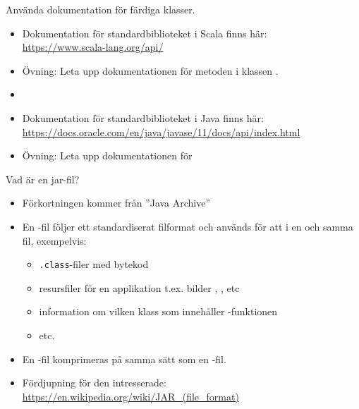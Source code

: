 \begin{Slide}{Använda dokumentation för färdiga klasser.}
\begin{itemize}
  \item Dokumentation för standardbiblioteket i Scala finns här:  \\ \url{https://www.scala-lang.org/api/}
  \item Övning: Leta upp dokumentationen för metoden  i klassen .
  \item[]
  \item Dokumentation för standardbiblioteket i Java finns här:  \\ 
  \url{https://docs.oracle.com/en/java/javase/11/docs/api/index.html}
  \item Övning: Leta upp dokumentationen för 

\end{itemize}
\end{Slide}


\begin{Slide}{Vad är en jar-fil?}
\begin{itemize}
  \item Förkortningen  kommer från ''Java Archive''
  \item En -fil följer ett standardiserat filformat och används för att  i en och samma fil, exempelvis:
  \begin{itemize}
    \item \texttt{.class}-filer med bytekod
    \item resursfiler för en applikation t.ex. bilder , , etc
    \item information om vilken klass som innehåller -funktionen
    \item etc.
  \end{itemize}
  \item En -fil komprimeras på samma sätt som en -fil.
  \item Fördjupning för den intresserade:\\
  {\SlideFontTiny\url{https://en.wikipedia.org/wiki/JAR_(file_format)}}
\end{itemize}
\end{Slide}


